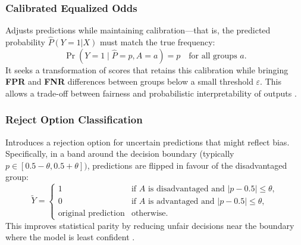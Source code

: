 \documentclass[12pt,a4paper,openright,twoside]{book}
\begin{document}
\subsubsection{Calibrated Equalized Odds} Adjusts predictions while maintaining calibration—that is, the predicted probability \begin{math}\hat{P}(Y=1|X)\end{math} must match the true frequency:
\begin{equation}
        \Pr(Y = 1 \mid \hat{P} = p, A = a) = p \quad\text{for all groups } a.
\end{equation}
It seeks a transformation of scores that retains this calibration while bringing \textbf{FPR} and \textbf{FNR} differences between groups below a small threshold \begin{math}\varepsilon\end{math}. This allows a trade-off between fairness and probabilistic interpretability of outputs \cite{NIPS2017_b8b9c74a}.

\subsubsection{Reject Option Classification} Introduces a rejection option for uncertain predictions that might reflect bias. Specifically, in a band around the decision boundary (typically \begin{math} p \in [0.5 - \theta, 0.5 + \theta]) \end{math}, predictions are flipped in favour of the disadvantaged group:
\begin{equation}
    \widetilde{Y} =
        \begin{cases}
        1 & \text{if } A \text{ is disadvantaged and } |p - 0.5| \le \theta, \\
        0 & \text{if } A \text{ is advantaged and } |p - 0.5| \le \theta, \\
        \text{original prediction} & \text{otherwise.}
        \end{cases}
\end{equation}
This improves statistical parity by reducing unfair decisions near the boundary where the model is least confident \cite{6413831}.
\end{document}
